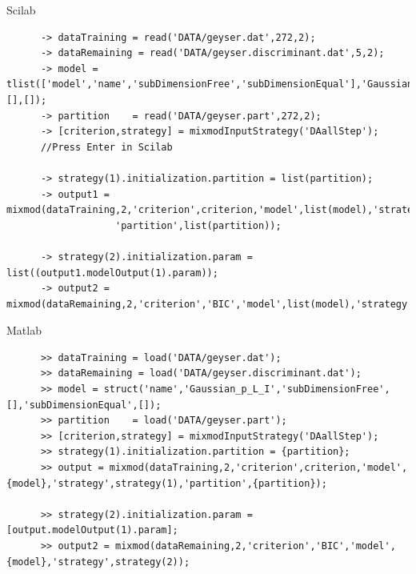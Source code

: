  Scilab
 {\scriptsize
  \begin{verbatim}
      -> dataTraining = read('DATA/geyser.dat',272,2);
      -> dataRemaining = read('DATA/geyser.discriminant.dat',5,2);
      -> model = tlist(['model','name','subDimensionFree','subDimensionEqual'],'Gaussian_p_L_I',[],[]);
      -> partition    = read('DATA/geyser.part',272,2);
      -> [criterion,strategy] = mixmodInputStrategy('DAallStep');
      //Press Enter in Scilab

      -> strategy(1).initialization.partition = list(partition);
      -> output1 = mixmod(dataTraining,2,'criterion',criterion,'model',list(model),'strategy',strategy(1),
                   'partition',list(partition));

      -> strategy(2).initialization.param = list((output1.modelOutput(1).param));
      -> output2 = mixmod(dataRemaining,2,'criterion','BIC','model',list(model),'strategy',strategy(2));
  \end{verbatim}}

  Matlab
 {\scriptsize
  \begin{verbatim}
      >> dataTraining = load('DATA/geyser.dat');
      >> dataRemaining = load('DATA/geyser.discriminant.dat');
      >> model = struct('name','Gaussian_p_L_I','subDimensionFree',[],'subDimensionEqual',[]);
      >> partition    = load('DATA/geyser.part');
      >> [criterion,strategy] = mixmodInputStrategy('DAallStep');
      >> strategy(1).initialization.partition = {partition};
      >> output = mixmod(dataTraining,2,'criterion',criterion,'model',{model},'strategy',strategy(1),'partition',{partition});

      >> strategy(2).initialization.param = [output.modelOutput(1).param];
      >> output2 = mixmod(dataRemaining,2,'criterion','BIC','model',{model},'strategy',strategy(2));

  \end{verbatim}}




